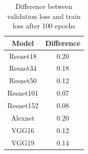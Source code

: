 \begin{table}[h]
\centering
        \begin{tabular}{ c c  }
                 Model&Difference\\
                 \hline
                   Resnet18&0.20\\
Resnet34&0.18\\
Resnet50&0.12\\
Resnet101&0.07\\
Resnet152&0.08\\
Alexnet&0.20\\
VGG16&0.12\\
VGG19&0.14\\
                    \end{tabular}
                    \caption{Difference between validation loss and train loss after 100 epochs }                   
                     \label{tab:difference_val_tra_loss_2}
     \end{table} 
     
